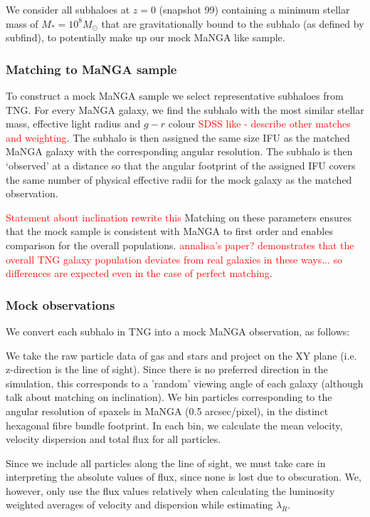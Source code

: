 \documentclass[fleqn,usenatbib]{mnras}
\newcommand{\red}[1]{{\textcolor{red}{#1}}}
\begin{document}
We consider all subhaloes at $z=0$ (snapshot 99) containing a minimum stellar mass of $M_{\ast} = 10^{8} M_{\odot}$ that are gravitationally bound to the subhalo (as defined by subfind), to potentially make up our mock MaNGA like sample. 

\subsubsection{Matching to MaNGA sample}
To construct a mock MaNGA sample we select representative subhaloes from TNG. For every MaNGA galaxy, we find the subhalo with the most similar stellar mass, effective light radius and $g - r$ colour \red{SDSS like - describe other matches and weighting}. The subhalo is then assigned the same size IFU as the matched MaNGA galaxy with the corresponding angular resolution. The subhalo is then `observed' at a distance so that the angular footprint of the assigned IFU covers the same number of physical effective radii for the mock galaxy as the matched observation. 

\red{Statement about inclination}
\red{rewrite this} Matching on these parameters ensures that the mock sample is consistent with MaNGA to first order and enables comparison for the overall populations. \red{annalisa's paper? demonstrates that the overall TNG galaxy population deviates from real galaxies in these ways... so differences are expected even in the case of perfect matching}. 

\subsubsection{Mock observations}
We convert each subhalo in TNG into a mock MaNGA observation, as follows:

We take the raw particle data of gas and stars and project on the XY plane (i.e. z-direction is the line of sight). Since there is no preferred direction in the simulation, this corresponds to a 'random' viewing angle of each galaxy (although talk about matching on inclination). We bin particles corresponding to the angular resolution of spaxels in MaNGA (0.5 arcsec/pixel), in the distinct hexagonal fibre bundle footprint. In each bin, we calculate the mean velocity, velocity dispersion and total flux for all particles.

Since we include all particles along the line of sight, we must take care in interpreting the absolute values of flux, since none is lost due to obscuration. We, however, only use the flux values relatively when calculating the luminosity weighted averages of velocity and dispersion while estimating $\lambda_R$. 
\end{document}
